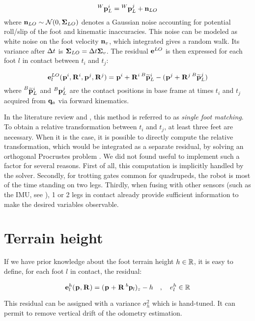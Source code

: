 \begin{equation}
    \prescript{W}{}{{\bf p}}_{L}^i = \prescript{W}{}{{\bf p}}_{L}^j + {\bf n}_{LO}
\end{equation}
%
where ${\bf n}_{LO} \sim \mathcal{N}({0},{{\bm \Sigma}_{LO}})$ denotes a Gaussian noise accounting for potential roll/slip of the foot and kinematic inaccuracies.
This noise can be modeled as white noise on the foot velocity ${\bf n}_v$, which integrated gives a random walk.  
Its variance after $\Delta t$ is ${\bm \Sigma}_{LO} = \Delta t {\bm \Sigma}_v$.
The residual ${\bf e}^{LO}$ is then expressed for each foot $l$ in contact between $t_i$ and $t_j$:

\begin{equation}
    {\bf e}^{LO}_l(\prescript{}{}{{\bf p}}_{}^i, \prescript{}{}{{\bf R}}_{}^i, \prescript{}{}{{\bf p}}_{}^j, \prescript{}{}{{\bf R}}_{}^j) = \prescript{}{}{{\bf p}}_{}^i + \prescript{}{}{{\bf R}}_{}^i \prescript{B}{}{\widetilde{{\bf p}}}_{L}^i - (\prescript{}{}{{\bf p}}_{}^j + \prescript{}{}{{\bf R}}_{}^j \prescript{B}{}{\widetilde{{\bf p}}}_{L}^j)
\end{equation}
%
where $\prescript{B}{}{\widetilde{{\bf p}}}_{L}^i$ and $\prescript{B}{}{{\bf p}}_{L}^j$ are the contact positions in base frame at times $t_i$ and $t_j$ acquired from ${\bf q}_a$ via forward kinematics. 

In the literature review and , this method is referred to as \textit{single foot matching}. To obtain
a relative transformation between $t_i$ and $t_j$, at least three feet are necessary. When it is the case, it is possible to directly compute the
relative transformation, which would be integrated as a separate residual, by solving an orthogonal Procrustes problem \cite{roston1991dead}.
We did not found useful to implement such a factor for several reasons. First of all, this computation is implicitly handled by the solver.
Secondly, for trotting gates common for quadrupeds, the robot is most of the time standing on two legs. Thirdly, when fusing with other sensors (such as the IMU,
see ), 1 or 2 legs in contact already provide sufficient information to make the desired variables observable.



\section{Terrain height}
If we have prior knowledge about the foot terrain height $h \in \mathbb{R}$, it is easy to define, for each foot $l$ in contact, the residual:

\begin{equation}
    {\bf e}^h_l(\prescript{}{}{{\bf p}}_{}, \prescript{}{}{{\bf R}}_{}) = (\prescript{}{}{{\bf p}}_{} + \prescript{}{}{{\bf R}}_{} \prescript{b}{}{{\bf p}}_{l})_z - h \quad, \quad e^{h}_l \in \mathbb{R}
\end{equation}

This residual can be assigned with a variance $\sigma_h^2$ which is hand-tuned. 
It can permit to remove vertical drift of the odometry estimation.
